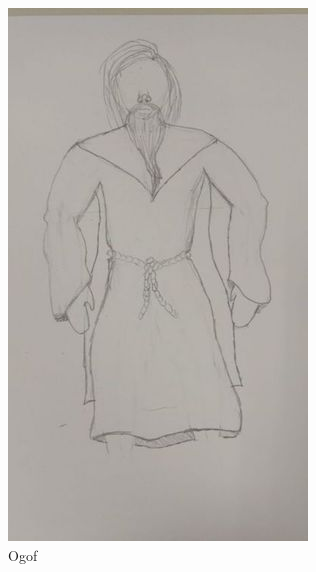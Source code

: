 \begin{figure}[htb]
	\caption{\label{Ogof}Ogof}
	\begin{center}
	    \includegraphics[width=\textwidth/2]{imagens/Ogof.jpg}
	\end{center}
\end{figure}

